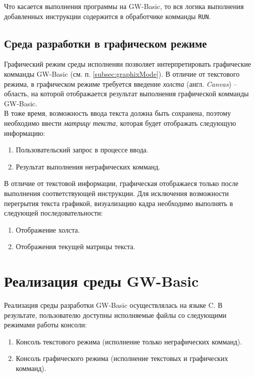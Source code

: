 \documentclass[12pt]{article}
\begin{document}
			\indent Что касается выполнения программы на GW-Basic, то вся логика выполнения добавленных инструкции содержится в обработчике комманды {\tt RUN}.
			\subsection{Среда разработки в графическом режиме}
			\hspace{\parindent} Графический режим среды исполненяи позволяет интерпретировать графические комманды GW-Basic (см. п. \ref{subsec:graphixMode}). В отличие от текстового режима, в графическом режиме требуется введение {\it холста} (англ. {\it Canvas}) -- область, на которой отображается результат выполнения графической комманды GW-Basic. \\ 
			\indent В тоже время, возможность ввода текста должна быть сохранена, поэтому необходимо ввести {\it матрицу текста}, которая будет отображать следующую информацию:
			\begin{enumerate}
				\item Пользовательский запрос в процессе ввода.
				\item Результат выполнения неграфических комманд.
			\end{enumerate}

			\indent В отличие от текстовой информации, графическая отображаеся только после выполнения соответствующей инструкции. Для исключения возможности перегрытия текста графикой, визуализацию кадра необходимо выполнять в следующей последовательности:
			\begin{enumerate}
				\item Отображение холста.
				\item Отображения текущей матрицы текста.
			\end{enumerate}
			
	\newpage
	\section{Реализация среды GW-Basic}
		\hspace{\parindent} Реализация среды разработки GW-Basic осуществлялась на языке C. В результате, пользователю доступны исполняемые файлы со следующими режимами работы консоли:
		\begin{enumerate}
			\item Консоль текстового режима (исполнение только неграфических комманд).
			\item Консоль графического режима (исполнение текстовых и графических комманд).
		\end{enumerate}
		
\end{document}
